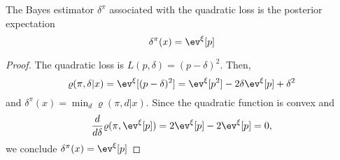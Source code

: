 \begin{proposition}
    \label{prop:quadratic-loss}
    The Bayes estimator $\delta^{\pi}$ associated with the quadratic loss is
    the posterior expectation
    $$
    \delta^{\pi}(x) = \ev^{\xi}[p]
    $$
\end{proposition}

\begin{proof}
    The quadratic loss is $L(p, \delta) = (p - \delta)^2$. Then, 
    $$
    \varrho(\pi, \delta|x) = \ev^{\xi}[(p - \delta)^2] = \ev^{\xi}[p^2] - 2\delta \ev^{\xi}[p] + \delta^2
    $$
    and $\delta^{\pi}(x) = \min_{d} \varrho(\pi, d|x)$. Since  the quadratic
    function is convex and 
    $$
    \frac{d}{d\delta} \varrho(\pi, \ev^{\xi}[p]) = 2\ev^{\xi}[p] - 2\ev^{\xi}[p] = 0,
    $$
    we conclude $\delta^{\pi}(x) = \ev^{\xi}[p]$
\end{proof}

